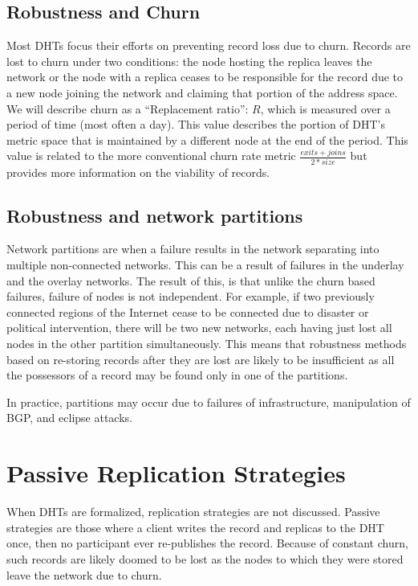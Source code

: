 \subsection{Robustness and Churn}
Most DHTs focus their efforts on preventing record loss due to churn.
Records are lost to churn under two conditions: the node hosting the replica leaves the network or the node with a replica ceases to be responsible for the record due to a new node joining the network and claiming that portion of the address space. 
We will describe churn as a ``Replacement ratio'': $R$, which is measured over a period of time (most often a day).
This value describes the portion of DHT's metric space that is maintained by a different node at the end of the period.
This value is related to the more conventional churn rate metric $\frac{exits + joins}{2*size}$ but provides more information on the viability of records.

\subsection{Robustness and network partitions}
Network partitions are when a failure results in the network separating into multiple non-connected networks.
This can be a result of failures in the underlay and the overlay networks.
The result of this, is that unlike the churn based failures, failure of nodes is not independent.
For example, if two previously connected regions of the Internet cease to be connected due to disaster or political intervention, there will be two new networks, each having just lost all nodes in the other partition simultaneously.
This means that robustness methods based on re-storing records after they are lost are likely to be insufficient as all the possessors of a record may be found only in one of the partitions.

In practice, partitions may occur due to failures of infrastructure, manipulation of BGP, and eclipse attacks.

\section{Passive Replication Strategies}

When DHTs are formalized\cite{chord}\cite{kademlia}, replication strategies are not discussed.
Passive strategies are those where a client writes the record and replicas to the DHT once, then no participant ever re-publishes the record.
Because of constant churn, such records are likely doomed to be lost as the nodes to which they were stored leave the network due to churn.

